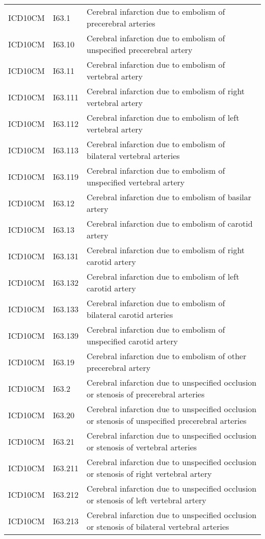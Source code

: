 \begin{longtable}{p{}p{}p{}}
  ICD10CM & I63.1 & Cerebral infarction due to embolism of precerebral arteries \\ 
  ICD10CM & I63.10 & Cerebral infarction due to embolism of unspecified precerebral artery \\ 
  ICD10CM & I63.11 & Cerebral infarction due to embolism of vertebral artery \\ 
  ICD10CM & I63.111 & Cerebral infarction due to embolism of right vertebral artery \\ 
  ICD10CM & I63.112 & Cerebral infarction due to embolism of left vertebral artery \\ 
  ICD10CM & I63.113 & Cerebral infarction due to embolism of bilateral vertebral arteries \\ 
  ICD10CM & I63.119 & Cerebral infarction due to embolism of unspecified vertebral artery \\ 
  ICD10CM & I63.12 & Cerebral infarction due to embolism of basilar artery \\ 
  ICD10CM & I63.13 & Cerebral infarction due to embolism of carotid artery \\ 
  ICD10CM & I63.131 & Cerebral infarction due to embolism of right carotid artery \\ 
  ICD10CM & I63.132 & Cerebral infarction due to embolism of left carotid artery \\ 
  ICD10CM & I63.133 & Cerebral infarction due to embolism of bilateral carotid arteries \\ 
  ICD10CM & I63.139 & Cerebral infarction due to embolism of unspecified carotid artery \\ 
  ICD10CM & I63.19 & Cerebral infarction due to embolism of other precerebral artery \\ 
  ICD10CM & I63.2 & Cerebral infarction due to unspecified occlusion or stenosis of precerebral arteries \\ 
  ICD10CM & I63.20 & Cerebral infarction due to unspecified occlusion or stenosis of unspecified precerebral arteries \\ 
  ICD10CM & I63.21 & Cerebral infarction due to unspecified occlusion or stenosis of vertebral arteries \\ 
  ICD10CM & I63.211 & Cerebral infarction due to unspecified occlusion or stenosis of right vertebral artery \\ 
  ICD10CM & I63.212 & Cerebral infarction due to unspecified occlusion or stenosis of left vertebral artery \\ 
  ICD10CM & I63.213 & Cerebral infarction due to unspecified occlusion or stenosis of bilateral vertebral arteries \\ 

\end{longtable}
